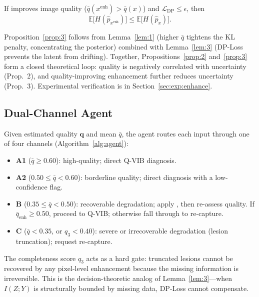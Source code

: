 \begin{proposition}
\label{prop:3}
If \VisiEnhance{} improves image quality ($\bar{q}(x^{\text{enh}}) > \bar{q}(x)$) and $\mathcal{L}_{\text{DP}} \leq \epsilon$, then
\begin{equation}
  \mathbb{E}\bigl[H(\hat{p}_{x^{\text{enh}}})\bigr]
  \leq \mathbb{E}\bigl[H(\hat{p}_{x})\bigr].
  \label{eq:prop3}
\end{equation}
\end{proposition}

Proposition~\ref{prop:3} follows from Lemma~\ref{lem:1} (higher $\bar{q}$ tightens the KL penalty, concentrating the posterior) combined with Lemma~\ref{lem:3} (DP-Loss prevents the latent from drifting).
Together, Propositions~\ref{prop:2} and~\ref{prop:3} form a closed theoretical loop: quality is negatively correlated with uncertainty (Prop.~2), and quality-improving enhancement further reduces uncertainty (Prop.~3).
Experimental verification is in Section~\ref{sec:exp:enhance}.

\subsection{Dual-Channel Agent}
\label{sec:method:agent}

Given estimated quality $\mathbf{q}$ and mean $\bar{q}$, the agent routes each input through one of four channels (Algorithm~\ref{alg:agent}):

\begin{itemize}[itemsep=2pt]
  \item \textbf{A1} ($\bar{q} \geq 0.60$): high-quality; direct Q-VIB diagnosis.
  \item \textbf{A2} ($0.50 \leq \bar{q} < 0.60$): borderline quality; direct diagnosis with a low-confidence flag.
  \item \textbf{B} ($0.35 \leq \bar{q} < 0.50$): recoverable degradation; apply \VisiEnhance{}, then re-assess quality.
    If $\bar{q}_{\text{enh}} \geq 0.50$, proceed to Q-VIB; otherwise fall through to re-capture.
  \item \textbf{C} ($\bar{q} < 0.35$, or $q_3 < 0.40$): severe or irrecoverable degradation (lesion truncation); request re-capture.
\end{itemize}

The completeness score $q_3$ acts as a hard gate: truncated lesions cannot be recovered by any pixel-level enhancement because the missing information is irreversible.
This is the decision-theoretic analog of Lemma~\ref{lem:3}—when $I(Z; Y)$ is structurally bounded by missing data, DP-Loss cannot compensate.

